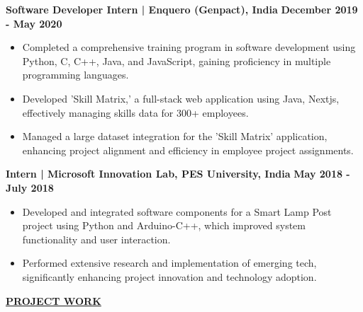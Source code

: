 \documentclass{article}
\begin{document}
\noindent \textbf{Software Developer Intern | Enquero (Genpact), India} \hfill \textbf{December 2019 - May 2020}
\begin{itemize}[noitemsep,nolistsep,leftmargin=*]
\item {\small Completed a comprehensive training program in software development using Python, C, C++, Java, and JavaScript, gaining proficiency in multiple programming languages.}
\item {\small Developed 'Skill Matrix,' a full-stack web application using Java, Nextjs, effectively managing skills data for 300+ employees.}
\item {\small Managed a large dataset integration for the 'Skill Matrix' application, enhancing project alignment and efficiency in employee project assignments.}
\end{itemize}
\noindent \textbf{Intern | Microsoft Innovation Lab, PES University, India} \hfill \textbf{May 2018 - July 2018}
\begin{itemize}[noitemsep,nolistsep,leftmargin=*]
\item {\small Developed and integrated software components for a Smart Lamp Post project using Python and Arduino-C++, which improved system functionality and user interaction.}
\item {\small Performed extensive research and implementation of emerging tech, significantly enhancing project innovation and technology adoption.}\\
\end{itemize}

%
%


\noindent \textbf{\underline{PROJECT WORK}} 
\end{document}
